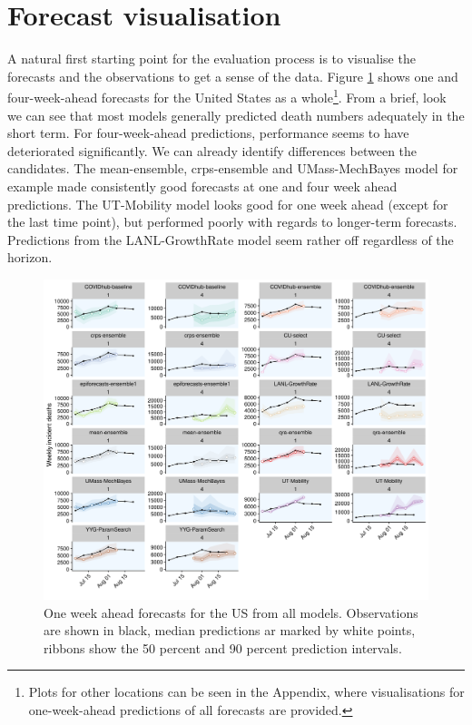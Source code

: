 \documentclass[
]{book}
\begin{document}
\hypertarget{visualisation}{%
\section{Forecast visualisation}\label{visualisation}}

A natural first starting point for the evaluation process is to visualise the forecasts and the observations to get a sense of the data. Figure \ref{fig:models-us} shows one and four-week-ahead forecasts for the United States as a whole\footnote{Plots for other locations can be seen in the Appendix, where visualisations for one-week-ahead predictions of all forecasts are provided.}. From a brief, look we can see that most models generally predicted death numbers adequately in the short term. For four-week-ahead predictions, performance seems to have deteriorated significantly. We can already identify differences between the candidates. The mean-ensemble, crps-ensemble and UMass-MechBayes model for example made consistently good forecasts at one and four week ahead predictions. The UT-Mobility model looks good for one week ahead (except for the last time point), but performed poorly with regards to longer-term forecasts. Predictions from the LANL-GrowthRate model seem rather off regardless of the horizon.

\begin{figure}
\includegraphics[width=1\linewidth]{../visualisation/chapter-5-results/scenario-baseline/US-forecast-1-4-wk-ahead} \caption{One week ahead forecasts for the US from all models. Observations are shown in black, median predictions ar marked by white points, ribbons show the 50 percent and 90 percent prediction intervals.}\label{fig:models-us}
\end{figure}
\end{document}
